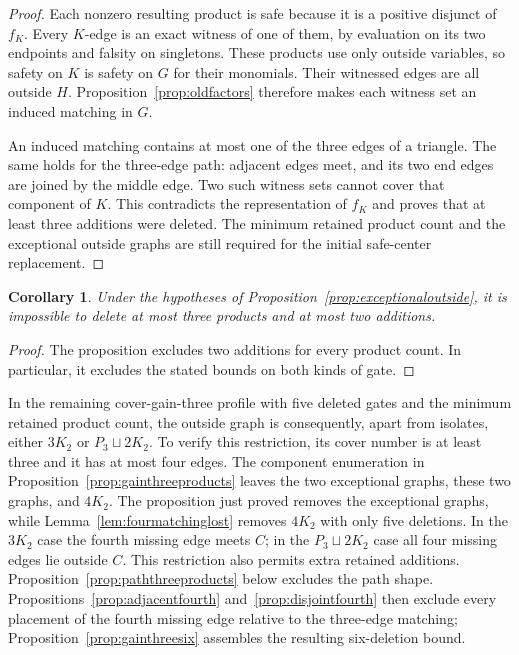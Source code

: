 \documentclass[11pt]{article}
\newtheorem{corollary}[theorem]{Corollary}
\theoremstyle{definition}
\theoremstyle{remark}
\begin{document}
\begin{proof}
Each nonzero resulting product is safe because it is a positive disjunct of $f_K$. Every $K$-edge is an exact witness of one of them, by evaluation on its two endpoints and falsity on singletons. These products use only outside variables, so safety on $K$ is safety on $G$ for their monomials. Their witnessed edges are all outside $H$. Proposition~\ref{prop:oldfactors} therefore makes each witness set an induced matching in $G$.

An induced matching contains at most one of the three edges of a triangle. The same holds for the three-edge path: adjacent edges meet, and its two end edges are joined by the middle edge. Two such witness sets cannot cover that component of $K$. This contradicts the representation of $f_K$ and proves that at least three additions were deleted. The minimum retained product count and the exceptional outside graphs are still required for the initial safe-center replacement.
\end{proof}

\begin{corollary}\label{cor:exceptionalbounded}
Under the hypotheses of Proposition~\ref{prop:exceptionaloutside}, it is impossible to delete at most three products and at most two additions.
\end{corollary}
\begin{proof}
The proposition excludes two additions for every product count. In particular, it excludes the stated bounds on both kinds of gate.
\end{proof}

In the remaining cover-gain-three profile with five deleted gates and the minimum retained product count, the outside graph is consequently, apart from isolates, either $3K_2$ or $P_3\sqcup2K_2$. To verify this restriction, its cover number is at least three and it has at most four edges. The component enumeration in Proposition~\ref{prop:gainthreeproducts} leaves the two exceptional graphs, these two graphs, and $4K_2$. The proposition just proved removes the exceptional graphs, while Lemma~\ref{lem:fourmatchinglost} removes $4K_2$ with only five deletions. In the $3K_2$ case the fourth missing edge meets $C$; in the $P_3\sqcup2K_2$ case all four missing edges lie outside $C$. This restriction also permits extra retained additions. Proposition~\ref{prop:paththreeproducts} below excludes the path shape. Propositions~\ref{prop:adjacentfourth} and~\ref{prop:disjointfourth} then exclude every placement of the fourth missing edge relative to the three-edge matching; Proposition~\ref{prop:gainthreesix} assembles the resulting six-deletion bound.
\end{document}

